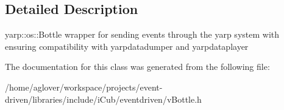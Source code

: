 \subsection{Detailed Description}
yarp\+::os\+::\+Bottle wrapper for sending events through the yarp system with ensuring compatibility with yarpdatadumper and yarpdataplayer 

The documentation for this class was generated from the following file\+:\begin{DoxyCompactItemize}
\item 
/home/aglover/workspace/projects/event-\/driven/libraries/include/i\+Cub/eventdriven/v\+Bottle.\+h\end{DoxyCompactItemize}

